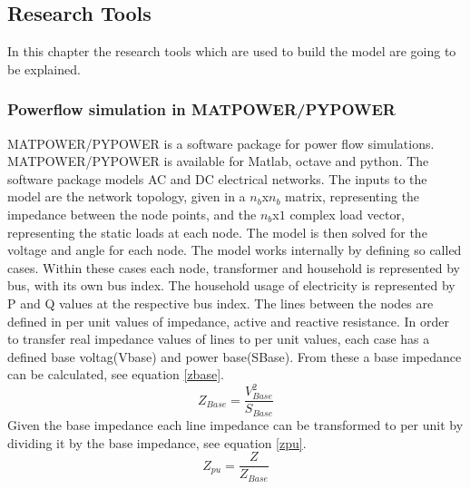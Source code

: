 \documentclass[a4paper]{article}
\begin{document}

\subsection{Research Tools}
In this chapter the research tools which are used to build the model are going to be explained.
\subsubsection{Powerflow simulation in MATPOWER/PYPOWER}
MATPOWER/PYPOWER is a software package for power flow simulations. MATPOWER/PYPOWER is available for Matlab, octave and python.
The software package models AC and DC electrical networks. The inputs to the model are the network topology, given in 
a $n_b$x$n_b$ matrix, representing the impedance between the node points,  and the  $n_b$x$1$ complex load vector, 
representing the static loads at each node.  The model is then solved for the voltage and angle for each node. The 
model works internally by defining so called cases. Within these cases each node, transformer and household is represented by bus, 
with its own bus index. The household usage of electricity is represented by P and Q values at the respective bus index. 
The lines between the nodes are defined in per unit values of impedance, active and reactive resistance. In order to transfer 
real impedance values of lines to per unit values, each case has a defined base voltag(Vbase) and power base(SBase). From these 
a base impedance can be calculated, see equation \ref{zbase}.\cite{powertransfer}
\begin{equation}
Z_{Base} = \frac{V_{Base}^2}{S_{Base}}
\label{zbase}
\end{equation}
Given the base impedance each line impedance can be transformed to per unit by dividing it by the base impedance, see equation \ref{zpu}.
\begin{equation}
Z_{pu}=\frac{Z}{Z_{Base}}
\label{zpu}
\end{equation}
\end{document}

